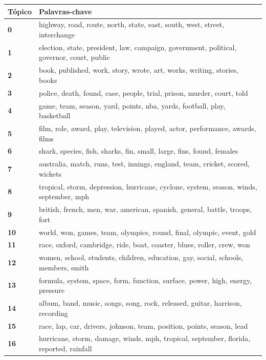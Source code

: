 \begin{table}[htpb]
    \centering
    \scriptsize
    \begin{tabularx}{\textwidth}{@{}l X@{}}
        \toprule
        \textbf{Tópico} & \textbf{Palavras-chave} \\
        \midrule
        \textbf{0} & highway, road, route, north, state, east, south, west, street, interchange \\
        \textbf{1} & election, state, president, law, campaign, government, political, governor, court, public \\
        \textbf{2} & book, published, work, story, wrote, art, works, writing, stories, books \\
        \textbf{3} & police, death, found, case, people, trial, prison, murder, court, told \\
        \textbf{4} & game, team, season, yard, points, nba, yards, football, play, basketball \\
        \textbf{5} & film, role, award, play, television, played, actor, performance, awards, films \\
        \textbf{6} & shark, species, fish, sharks, fin, small, large, fins, found, females \\
        \textbf{7} & australia, match, runs, test, innings, england, team, cricket, scored, wickets \\
        \textbf{8} & tropical, storm, depression, hurricane, cyclone, system, season, winds, september, mph \\
        \textbf{9} & british, french, men, war, american, spanish, general, battle, troops, fort \\
        \textbf{10} & world, won, games, team, olympics, round, final, olympic, event, gold \\
        \textbf{11} & race, oxford, cambridge, ride, boat, coaster, blues, roller, crew, won \\
        \textbf{12} & women, school, students, children, education, gay, social, schools, members, smith \\
        \textbf{13} & formula, system, space, form, function, surface, power, high, energy, pressure \\
        \textbf{14} & album, band, music, songs, song, rock, released, guitar, harrison, recording \\
        \textbf{15} & race, lap, car, drivers, johnson, team, position, points, season, lead \\
        \textbf{16} & hurricane, storm, damage, winds, mph, tropical, september, florida, reported, rainfall \\

\end{tabularx}
\end{table}
